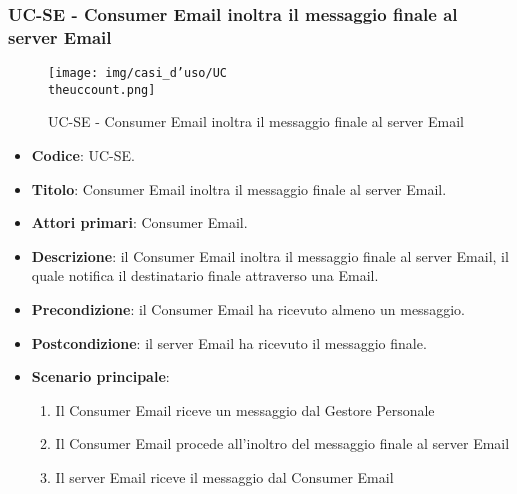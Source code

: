 \subsubsection{UC\theuccount-SE - Consumer Email inoltra il messaggio finale al server Email}
	\begin{figure}[H]
		\centering
		\texttt{[image: img/casi\_d'uso/UC\\theuccount.png]}\\
		\caption{UC\theuccount-SE - Consumer Email inoltra il messaggio finale al server Email}
	\end{figure}
	\begin{itemize}
		\item \textbf{Codice}: UC\theuccount-SE.
		\item \textbf{Titolo}: Consumer Email inoltra il messaggio finale al server Email.
		\item \textbf{Attori primari}: Consumer Email.
		\item \textbf{Descrizione}: il Consumer Email inoltra il messaggio finale al server Email, il quale notifica il destinatario finale attraverso una Email.
		\item \textbf{Precondizione}: il Consumer Email ha ricevuto almeno un messaggio.
		\item \textbf{Postcondizione}: il server Email ha ricevuto il messaggio finale.
		\item \textbf{Scenario principale}:
		\begin{enumerate}
			\item Il Consumer Email riceve un messaggio dal Gestore Personale
			\item Il Consumer Email procede all'inoltro del messaggio finale al server Email
            \item Il server Email riceve il messaggio dal Consumer Email
		\end{enumerate}

	\end{itemize}
